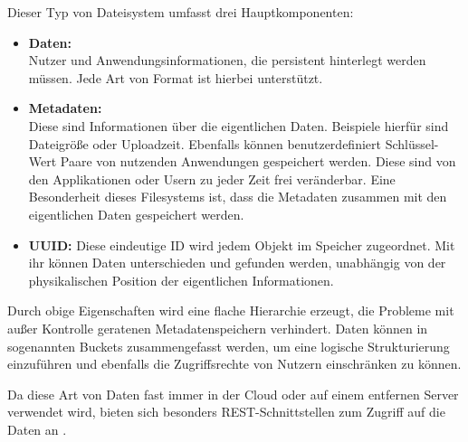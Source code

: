 Dieser Typ von Dateisystem umfasst drei Hauptkomponenten:

\begin{itemize}
	\item \textbf{Daten:}\\
	 Nutzer und Anwendungsinformationen, die persistent hinterlegt werden müssen. Jede Art von Format ist hierbei unterstützt.
	\item \textbf{Metadaten:}\\
	 Diese sind Informationen über die eigentlichen Daten. Beispiele hierfür sind Dateigröße oder Uploadzeit. Ebenfalls können benutzerdefiniert Schlüssel-Wert Paare von nutzenden Anwendungen gespeichert werden. Diese sind von den Applikationen oder Usern zu jeder Zeit frei veränderbar. Eine Besonderheit dieses Filesystems ist, dass die Metadaten zusammen mit den eigentlichen Daten gespeichert werden.
	\item \textbf{\ac{UUID}:} Diese eindeutige ID wird jedem Objekt im Speicher zugeordnet. Mit ihr können Daten unterschieden  und gefunden werden, unabhängig von der physikalischen Position der eigentlichen Informationen.
\end{itemize}

Durch obige Eigenschaften wird eine flache Hierarchie erzeugt, die Probleme mit außer Kontrolle geratenen Metadatenspeichern verhindert. Daten können in sogenannten Buckets zusammengefasst werden, um eine logische Strukturierung einzuführen und ebenfalls die Zugriffsrechte von Nutzern einschränken zu können.  

Da diese Art von Daten fast immer in der Cloud oder auf einem entfernen Server verwendet wird, bieten sich besonders REST-Schnittstellen zum Zugriff auf die Daten an \parencite[S. 4f]{Rios.2017}.

